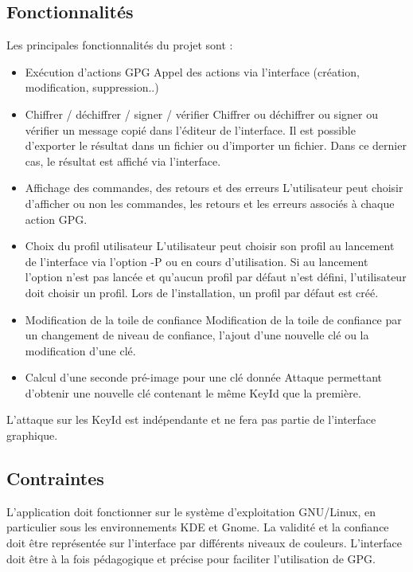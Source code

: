 \documentclass{../res/univ-projet}
\begin{document}
  \newpage
  
  \subsection{Fonctionnalités}
  
  Les principales fonctionnalités du projet sont : \medbreak
  \begin{itemize}
  \item Exécution d'actions GPG \smallbreak
  Appel des actions via l'interface (création, modification, suppression..) \smallbreak
  \item Chiffrer / déchiffrer / signer / vérifier \smallbreak
  Chiffrer ou déchiffrer ou signer ou vérifier un message copié dans l'éditeur de l'interface. Il est possible d'exporter le résultat dans un fichier ou d'importer un fichier. Dans ce dernier cas, le résultat est affiché via l'interface. \smallbreak
  \item Affichage des commandes, des retours et des erreurs \smallbreak
  L'utilisateur peut choisir d'afficher ou non les commandes, les retours et les erreurs associés à chaque action GPG. \smallbreak 
  \item Choix du profil utilisateur \smallbreak
  L'utilisateur peut choisir son profil au lancement de l'interface via l'option -P ou en cours d'utilisation. Si au lancement l'option n'est pas lancée et qu'aucun profil par défaut n'est défini, l'utilisateur doit choisir un profil. Lors de l'installation, un profil par défaut est créé. \smallbreak
  \item Modification de la toile de confiance \smallbreak
  Modification de la toile de confiance par un changement de niveau de confiance, l'ajout d'une nouvelle clé ou la modification d'une clé. \smallbreak
  \item Calcul d'une seconde pré-image pour une clé donnée \smallbreak
  Attaque permettant d'obtenir une nouvelle clé contenant le même KeyId que la première.
  \end{itemize}
  
  L'attaque sur les KeyId est indépendante et ne fera pas partie de l'interface graphique. 
  
  \subsection{Contraintes}
  
  L'application doit fonctionner sur le système d'exploitation GNU/Linux, en particulier sous les environnements KDE et Gnome. La validité et la confiance doit être représentée sur l'interface par différents niveaux de couleurs.
  L'interface doit être à la fois pédagogique et précise pour faciliter l'utilisation de GPG.
  
\end{document}
